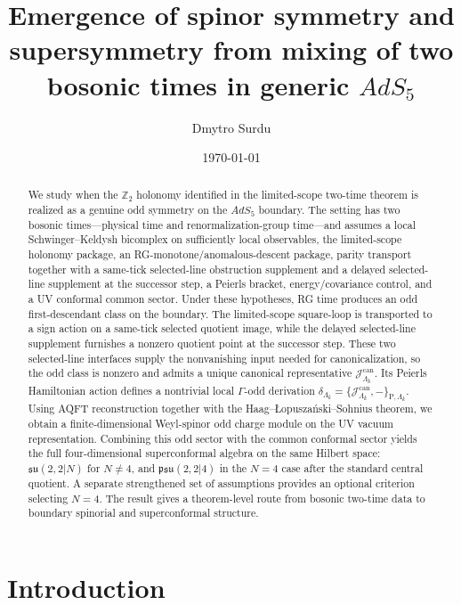 \documentclass[
  aps,
  prd,
  onecolumn,
  notitlepage,
  nofootinbib,
  superscriptaddress,
  10pt
]{revtex4-2}
\theoremstyle{definition}
\theoremstyle{plain}
\begin{document}
\title{Emergence of spinor symmetry and supersymmetry from mixing of two bosonic times in generic $AdS_5$}
\author{Dmytro Surdu}
\date{\today}

\begin{abstract}
We study when the \(\mathbb Z_2\) holonomy identified in the limited-scope two-time theorem is realized as a genuine odd symmetry on the \(AdS_5\) boundary. The setting has two bosonic times---physical time and renormalization-group time---and assumes a local Schwinger--Keldysh bicomplex on sufficiently local observables, the limited-scope holonomy package, an RG-monotone/anomalous-descent package, parity transport together with a same-tick selected-line obstruction supplement and a delayed selected-line supplement at the successor step, a Peierls bracket, energy/covariance control, and a UV conformal common sector. Under these hypotheses, RG time produces an odd first-descendant class on the boundary. The limited-scope square-loop is transported to a sign action on a same-tick selected quotient image, while the delayed selected-line supplement furnishes a nonzero quotient point at the successor step. These two selected-line interfaces supply the nonvanishing input needed for canonicalization, so the odd class is nonzero and admits a unique canonical representative \(\mathcal J^{\mathrm{can}}_{\Lambda_k}\). Its Peierls Hamiltonian action defines a nontrivial local \(\Gamma\)-odd derivation \(\delta_{\Lambda_k}=\{\mathcal J^{\mathrm{can}}_{\Lambda_k},-\}_{\mathrm P,\Lambda_k}\). Using AQFT reconstruction together with the Haag--\L opusza\'nski--Sohnius theorem, we obtain a finite-dimensional Weyl-spinor odd charge module on the UV vacuum representation. Combining this odd sector with the common conformal sector yields the full four-dimensional superconformal algebra on the same Hilbert space: \(\mathfrak{su}(2,2|N)\) for \(N\neq4\), and \(\mathfrak{psu}(2,2|4)\) in the \(N=4\) case after the standard central quotient. A separate strengthened set of assumptions provides an optional criterion selecting \(N=4\). The result gives a theorem-level route from bosonic two-time data to boundary spinorial and superconformal structure.
\end{abstract}

\maketitle

\section{Introduction}
\label{sec:intro}
\end{document}

